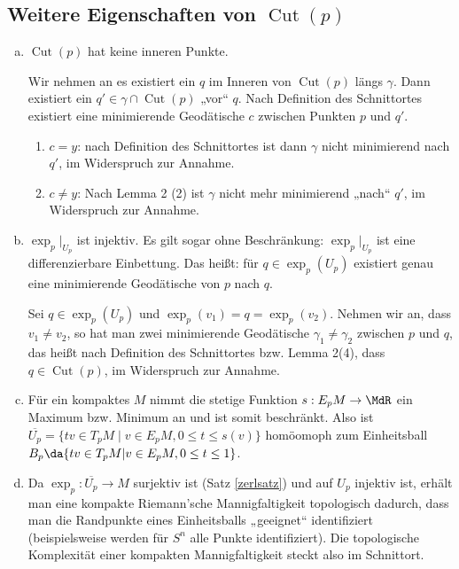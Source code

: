 \documentclass[a4paper,twoside,DIV15,BCOR12mm]{scrbook}
\DeclareMathOperator{\cut}{Cut}
\begin{document}
\subsection*{Weitere Eigenschaften von $\cut(p)$}
\begin{enumerate}[(a)]
\item $\cut(p)$ hat keine inneren Punkte.
\begin{beweis}
Wir nehmen an es existiert ein $q$ im Inneren von $\cut(p)$ längs $\gamma$. Dann existiert ein $q' \in \gamma \cap \cut(p)$ „vor“ $q$. Nach Definition des Schnittortes existiert eine minimierende Geodätische $c$ zwischen Punkten $p$ und $q'$.
\begin{enumerate}[1. {Fall:}]
\item $c=y$: nach Definition des Schnittortes ist dann $\gamma$ nicht minimierend nach $q'$, im Widerspruch zur Annahme.
\item $c\ne y$: Nach Lemma 2 (2) ist $\gamma$ nicht mehr minimierend „nach“ $q'$, im Widerspruch zur Annahme.
\end{enumerate}
\end{beweis}
\item $\exp_p|_{U_p}$ ist injektiv. Es gilt sogar ohne Beschränkung: $\exp_p|_{U_p}$ ist eine differenzierbare Einbettung. Das heißt: für $q\in \exp_p(U_p)$ existiert genau eine minimierende Geodätische von $p$ nach $q$.
\begin{beweis}
Sei $q\in\exp_p(U_p)$ und $\exp_p(v_1) = q = \exp_p(v_2)$. Nehmen wir an, dass $v_1\ne v_2$, so hat man zwei minimierende Geodätische $\gamma_1\ne \gamma_2$ zwischen $p$ und $q$, das heißt nach Definition des Schnittortes bzw. Lemma 2(4), dass $q\in \cut(p)$, im Widerspruch zur Annahme.
\end{beweis}
\item Für ein kompaktes $M$ nimmt die stetige Funktion $s: E_pM \to \MdR$ ein Maximum bzw. Minimum an und ist somit beschränkt. Also ist $\overline {U_p} = \{tv \in T_pM \mid v\in E_pM, 0\le t\le s(v)\}$ homöomoph zum Einheitsball $B_p \da \{tv \in T_pM | v\in E_pM, 0\le t \le 1\}$.
\item 
Da $\exp_p: \overline{U_p} \to M$ surjektiv ist (Satz \ref{zerlsatz}) und auf $U_p$ injektiv ist, erhält man eine kompakte Riemann’sche Mannigfaltigkeit topologisch dadurch, dass man die Randpunkte eines Einheitsballs „geeignet“ identifiziert (beispielsweise werden für $S^n$ alle Punkte identifiziert). Die topologische Komplexität einer kompakten Mannigfaltigkeit steckt also im Schnittort.
\end{enumerate}
\end{document}
